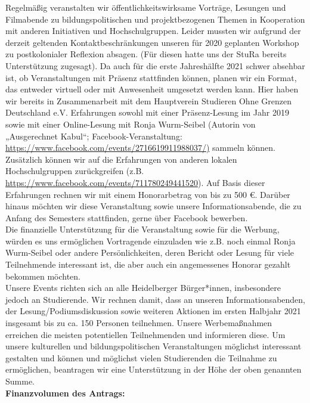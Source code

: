 {    Regelmäßig veranstalten wir öffentlichkeitswirksame Vorträge, Lesungen und Filmabende zu bildungspolitischen und projektbezogenen Themen in Kooperation mit anderen Initiativen und Hochschulgruppen. Leider mussten wir aufgrund der derzeit geltenden Kontaktbeschränkungen unseren für 2020 geplanten Workshop zu postkolonialer Reflexion absagen. (Für diesen hatte uns der StuRa bereits Unterstützung zugesagt). Da auch für die erste Jahreshälfte 2021 schwer absehbar ist, ob Veranstaltungen mit Präsenz stattfinden können, planen wir ein Format, das entweder virtuell oder mit Anwesenheit umgesetzt werden kann. Hier haben wir bereits in Zusammenarbeit mit dem Hauptverein Studieren Ohne Grenzen Deutschland e.V. Erfahrungen sowohl mit einer Präsenz-Lesung im Jahr 2019 sowie mit einer Online-Lesung mit Ronja Wurm-Seibel (Autorin von „Ausgerechnet Kabul“; Facebook-Veranstaltung: \url{https://www.facebook.com/events/2716619911988037/)} sammeln können. Zusätzlich können wir auf die Erfahrungen von anderen lokalen Hochschulgruppen zurückgreifen (z.B. \url{https://www.facebook.com/events/711780249441520}). Auf Basis dieser Erfahrungen rechnen wir mit einem Honorarbetrag von bis zu 500 €. Darüber hinaus möchten wir diese Veranstaltung sowie unsere Informationsabende, die zu Anfang des Semesters stattfinden, gerne über Facebook bewerben.\\
    Die finanzielle Unterstützung für die Veranstaltung sowie für die Werbung, würden es uns ermöglichen Vortragende einzuladen wie z.B. noch einmal Ronja Wurm-Seibel oder andere Persönlichkeiten, deren Bericht oder Lesung für viele Teilnehmende interessant ist, die aber auch ein angemessenes Honorar gezahlt bekommen möchten.\\
    Unsere Events richten sich an alle Heidelberger Bürger*innen, insbesondere jedoch an Studierende. Wir rechnen damit, dass an unseren Informationsabenden, der Lesung/Podiumsdiskussion sowie weiteren Aktionen im ersten Halbjahr 2021 insgesamt bis zu ca. 150 Personen teilnehmen. Unsere Werbemaßnahmen erreichen die meisten potentiellen Teilnehmenden und informieren diese. Um unsere kulturellen und bildungspolitischen Veranstaltungen möglichst interessant gestalten und können und möglichst vielen Studierenden die Teilnahme zu ermöglichen, beantragen wir eine Unterstützung in der Höhe der oben genannten Summe.\\[1em]
    \textbf{Finanzvolumen des Antrags:}\\
    \newline
    \begin{tabular}{l l}

\end{tabular}}
